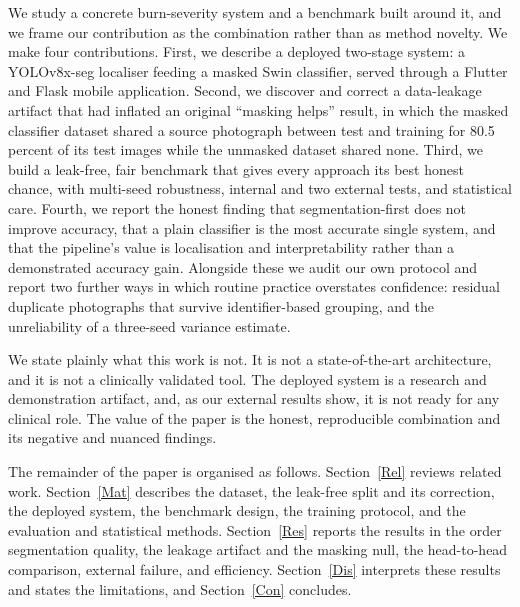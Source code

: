 \documentclass{elektr}
\begin{document}
We study a concrete burn-severity system and a benchmark built around it, and we frame our contribution as the combination rather than as method novelty. We make four contributions. First, we describe a deployed two-stage system: a YOLOv8x-seg localiser feeding a masked Swin classifier, served through a Flutter and Flask mobile application. Second, we discover and correct a data-leakage artifact that had inflated an original ``masking helps'' result, in which the masked classifier dataset shared a source photograph between test and training for 80.5 percent of its test images while the unmasked dataset shared none. Third, we build a leak-free, fair benchmark that gives every approach its best honest chance, with multi-seed robustness, internal and two external tests, and statistical care. Fourth, we report the honest finding that segmentation-first does not improve accuracy, that a plain classifier is the most accurate single system, and that the pipeline's value is localisation and interpretability rather than a demonstrated accuracy gain. Alongside these we audit our own protocol and report two further ways in which routine practice overstates confidence: residual duplicate photographs that survive identifier-based grouping, and the unreliability of a three-seed variance estimate.

We state plainly what this work is not. It is not a state-of-the-art architecture, and it is not a clinically validated tool. The deployed system is a research and demonstration artifact, and, as our external results show, it is not ready for any clinical role. The value of the paper is the honest, reproducible combination and its negative and nuanced findings.

The remainder of the paper is organised as follows. Section~\ref{Rel} reviews related work. Section~\ref{Mat} describes the dataset, the leak-free split and its correction, the deployed system, the benchmark design, the training protocol, and the evaluation and statistical methods. Section~\ref{Res} reports the results in the order segmentation quality, the leakage artifact and the masking null, the head-to-head comparison, external failure, and efficiency. Section~\ref{Dis} interprets these results and states the limitations, and Section~\ref{Con} concludes.
\end{document}
